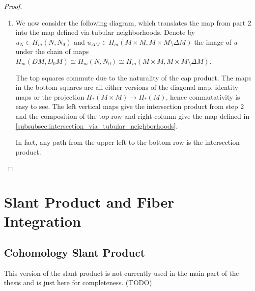 \documentclass{scrartcl}
\theoremstyle{plain}
\theoremstyle{definition}
\newcommand{\capp}{\mathbin{\frown}}
\newcommand{\iso}{\cong}
\begin{document}
\begin{proof}
\begin{enumerate}
        \item We now consider the following diagram, which translates the map from part 2 into the map defined via tubular neighborhoods.  Denote by $u_N\in H_m(N, N_0)$ and $u_{\Delta M}\in H_m(M\times M, M\times M\setminus \Delta M)$ the image of $u$ under the chain of maps $H_m(DM, D_0M) \iso H_m(N, N_0) \iso H_m(M\times M, M\times M\setminus \Delta M)$.
        
        \begin{center}
        \end{center}

        The top squares commute due to the naturality of the cap product. The maps in the bottom squares are all either versions of the diagonal map, identity maps or the projection $H_*(M\times M)\to H_*(M)$, hence commutativity is easy to see. The left vertical maps give the intersection product from step 2 and the composition of the top row and right column give the map defined in \ref{subsubsec:intersection_via_tubular_neighborhoods}.

        In fact, any path from the upper left to the bottom row is the intersection product.

    \end{enumerate}

\end{proof}


\section{Slant Product and Fiber Integration}

    \subsection{Cohomology Slant Product}
    This version of the slant product is not currently used in the main part of the thesis and is just here for completeness. (TODO)
\end{document}
